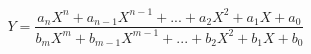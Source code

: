 

\[
Y = \frac{a_{n}X^{n} + a_{n-1}X^{n-1} + ... + a_{2}X^{2} + a_{1}X + a_{0}} {b_{m}X^{m} + b_{m-1}X^{m-1} + ... + b_{2}X^{2} + b_{1}X + b_{0}}
\]


